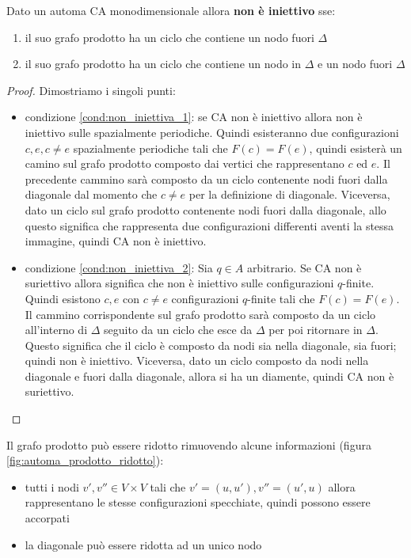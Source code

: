 \begin{teorema}
    Dato un automa CA monodimensionale allora \textbf{non è iniettivo} sse:
    \begin{enumerate}
        \item \label{cond:non_iniettiva_1} il suo grafo prodotto ha un ciclo che contiene un nodo fuori $\Delta$
        \item \label{cond:non_iniettiva_2}il suo grafo prodotto ha un ciclo che contiene un nodo in $\Delta$ e
        un nodo fuori $\Delta$
    \end{enumerate}
    \begin{proof}
        Dimostriamo i singoli punti:
        \begin{itemize}
            \item condizione \ref{cond:non_iniettiva_1}: se CA non è iniettivo 
            allora non è iniettivo sulle spazialmente periodiche. Quindi esisteranno
            due configurazioni $c,e, c\ne e$ spazialmente periodiche tali che $F(c) = F(e)$,
            quindi esisterà un camino sul grafo prodotto composto dai vertici che 
            rappresentano $c$ ed $e$. Il precedente cammino sarà composto da un ciclo
            contenente nodi fuori dalla diagonale dal momento che $c\ne e$ per la 
            definizione di diagonale. Viceversa, dato un ciclo sul grafo prodotto contenente nodi 
            fuori dalla diagonale, allo questo significa che rappresenta due 
            configurazioni differenti aventi la stessa immagine, quindi CA non è
            iniettivo.
            \item condizione \ref{cond:non_iniettiva_2}: Sia $q\in A$ arbitrario.
            Se CA non è suriettivo allora significa che non è iniettivo sulle 
            configurazioni $q$-finite. Quindi esistono $c,e$ con $c\ne e $ configurazioni
            $q$-finite tali che $F(c) =F(e)$. Il cammino corrispondente sul 
            grafo prodotto sarà composto da un ciclo all'interno di $\Delta$
            seguito da un ciclo che esce da $\Delta$ per poi ritornare in $\Delta$.
            Questo significa che il ciclo è composto da nodi sia nella diagonale,
            sia fuori; quindi non è iniettivo. Viceversa, dato un ciclo composto da nodi nella diagonale 
            e fuori dalla diagonale, allora si ha un diamente, quindi CA non è suriettivo.
            
        \end{itemize}
    \end{proof}
\end{teorema}
Il grafo prodotto può essere ridotto rimuovendo alcune informazioni (figura \ref{fig:automa_prodotto_ridotto}):
\begin{itemize}
    \item tutti i nodi $v',v'' \in V\times V$ tali che $v'= (u,u'), v''=(u',u)$
    allora rappresentano le stesse configurazioni specchiate, quindi possono essere 
    accorpati
    \item la diagonale può essere ridotta ad un unico nodo
\end{itemize}

